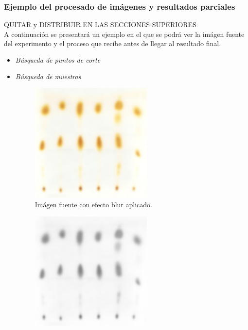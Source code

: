 \subsubsection{Ejemplo del procesado de im\'agenes y resultados parciales}
QUITAR y DISTRIBUIR EN LAS SECCIONES SUPERIORES\\
A continuaci\'on se presentar\'a un ejemplo en el que se podr\'a ver la im\'agen fuente del experimento y el proceso que recibe antes de llegar al resultado final.
\begin{itemize}
	\renewcommand{\labelitemi}{$\bullet$}
	\renewcommand{\labelitemii}{$\circ$}
	

	\item \textit{B\'usqueda de puntos de corte}
	
	\newpage
	\item \textit{B\'usqueda de muestras}
	\begin{figure}[H]
	  \vspace{-0.2cm}
	  \centering
	  \includegraphics[width=230px]{imagenes-jtlc/experimento/search-samples/1-blur}
	  \centering
	  \vspace{-0.4cm}
	  \caption{Im\'agen fuente con efecto blur aplicado.}
	  \label{fig:font-c-blur}
	  \vspace{-0.15cm}
	\end{figure}
	\begin{figure}[H]
	  \vspace{-0.2cm}
	  \centering
	  \includegraphics[width=230px]{imagenes-jtlc/experimento/search-samples/2-gray}

\end{figure}
\end{itemize}
